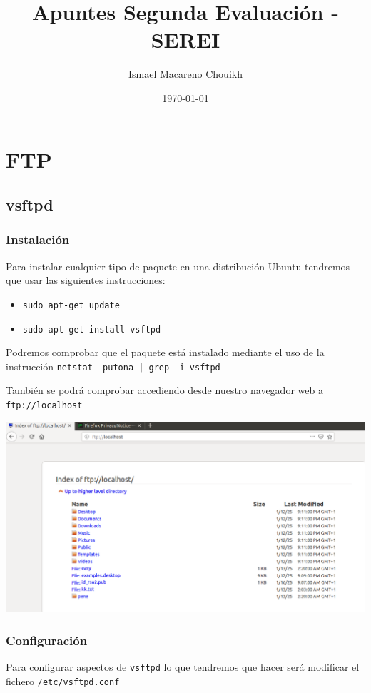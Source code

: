 \documentclass[11pt]{article}
\author{Ismael Macareno Chouikh}
\date{\today}
\title{Apuntes Segunda Evaluación - SEREI}
\newcommand\blankpage{\null\thispagestyle{empty}\newpage}
\begin{document}
\maketitle
\tableofcontents

\blankpage

\section{FTP}
\label{sec:orga619a6c}
\subsection{vsftpd}
\label{sec:org4b8fe45}
\subsubsection{Instalación}
\label{sec:org6bbf7bc}
Para instalar cualquier tipo de paquete en una distribución Ubuntu tendremos que usar las siguientes instrucciones:
\begin{itemize}
\item \texttt{sudo apt-get update}
\item \texttt{sudo apt-get install vsftpd}
\end{itemize}


Podremos comprobar que el paquete está instalado mediante el uso de la instrucción \texttt{netstat -putona | grep -i vsftpd}

También se podrá comprobar accediendo desde nuestro navegador web a \texttt{ftp://localhost}

\begin{center}
\includegraphics[width=.9\linewidth]{./media/ftp-1.png}
\end{center}

\subsubsection{Configuración}
\label{sec:org14e42e5}
Para configurar aspectos de \texttt{vsftpd} lo que tendremos que hacer será modificar el fichero \texttt{/etc/vsftpd.conf}
\end{document}
